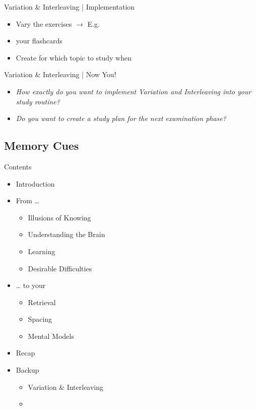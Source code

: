 \documentclass{ercisbeamer}
\begin{document}
\begin{frame}{Variation \& Interleaving | Implementation}
    \begin{itemize}
        \item Vary the exercises $\rightarrow$ E.g. 
        \item {} your flashcards
        \item Create  for which topic to study when 
    \end{itemize}
\end{frame}

\begin{frame}{Variation \& Interleaving | Now You!}
    \begin{itemize}
        \item \emph{How exactly do you want to implement Variation and Interleaving into your study routine?}
        \item \emph{Do you want to create a study plan for the next examination phase?}
    \end{itemize}
\end{frame}

\subsection{Memory Cues}
\begin{frame}{Contents}
    \begin{itemize}
        \item Introduction
        \item From …
        \begin{itemize}
            \item Illusions of Knowing
            \item Understanding the Brain
            \item Learning
            \item Desirable Difficulties
        \end{itemize}
        \item … to your 
        \begin{itemize}
            \item Retrieval
            \item Spacing
            \item Mental Models
        \end{itemize}
        \item Recap
        \item Backup
        \begin{itemize}
            \item Variation \& Interleaving
            \item {}
        \end{itemize}
    \end{itemize}
\end{frame}
\end{document}

